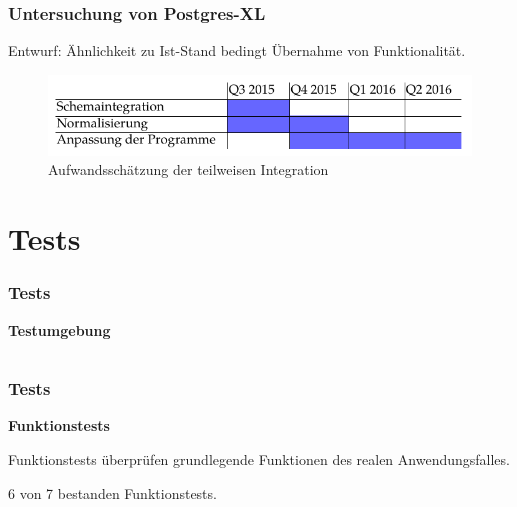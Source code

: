 \documentclass{beamer}
\begin{document}
\begin{frame}\frametitle{Untersuchung von Postgres-XL}
\begin{block}{Entwurf:}
Ähnlichkeit zu Ist-Stand bedingt Übernahme von Funktionalität.
\end{block}

\begin{figure}
\centering
\includegraphics[width=1\hsize]{../Abbildungen/gantt_aufwand_umsetzung_cropped.pdf}
\caption{Aufwandsschätzung der teilweisen Integration}
\end{figure}
\end{frame}

\section{Tests}

\begin{frame}\frametitle{Tests}
\centering\textbf{Testumgebung}

   \begin{columns}
    \begin{column}{.5\textwidth}

    \end{column}
    \begin{column}{.5\textwidth}
\resizebox{1\linewidth}{!}{}
    \end{column}
  \end{columns}
\end{frame}

\begin{frame}\frametitle{Tests}
\begin{center}
\textbf{Funktionstests}\\
\end{center}

\vspace{\baselineskip}
\vspace{\baselineskip}

Funktionstests überprüfen grundlegende Funktionen des realen Anwendungsfalles.

\vspace{\baselineskip}
\vspace{\baselineskip}

6 von 7 bestanden Funktionstests.
\end{frame}
\end{document}
